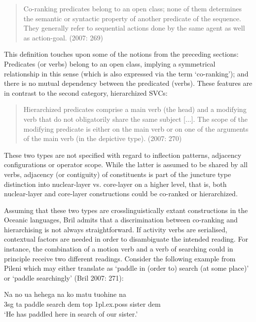 \begin{quote}Co-ranking predicates belong to an open class; none of them determines the
semantic or syntactic property of another predicate of the sequence. They generally
refer to sequential actions done by the same agent as well as action-goal. (2007: 269)\end{quote}

This definition touches upon some of the notions from the preceding sections: Predicates (or verbs) belong to an open class, implying a symmetrical relationship in this sense (which is also expressed via the term `co-ranking'); and there is no mutual dependency between the predicated (verbs). These features are in contrast to the second category, hierarchized SVCs:

\begin{quote}Hierarchized predicates comprise a main verb (the head) and a modifying verb
that do not obligatorily share the same subject [...]. The scope of the modifying
predicate is either on the main verb or on one of the arguments of the main verb (in the
depictive type). (2007: 270)\end{quote}

These two types are not specified with regard to inflection patterns, adjacency configurations or operator scope. While the latter is assumed to be shared by all verbs, adjacency (or contiguity) of constituents is part of the juncture type distinction into nuclear-layer vs. core-layer on a higher level, that is, both nuclear-layer and core-layer constructions could be co-ranked or hierarchized.

Assuming that these two types are crosslinguistically extant constructions in the Oceanic languages, Bril admits that a discrimination between co-ranking and hierarchising is not always straightforward. If activity verbs are serialised, contextual factors are needed in order to disambiguate the intended reading. For instance, the combination of a motion verb and a verb of searching could in principle receive two different readings. Consider the following example from Pileni which may either translate as `paddle in (order to) search (at some place)' or `paddle searchingly' (Bril 2007: 271):

\ea \label{}
\gll Na no ua hehega na ko matu tuohine na \\
\acs{3}\acs{sg} \acs{ta} paddle search \acs{dem} \acs{top} \acs{1}\acs{pl}.\acs{ex}.\acs{poss} sister \acs{dem} \\
\glft `He has paddled here in search of our sister.’ \\ 
\z
\xe

